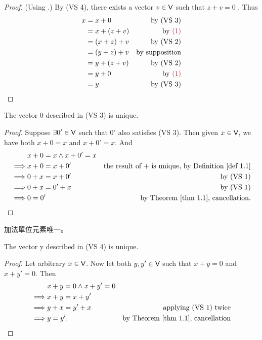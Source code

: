 \begin{proof}
(Using .)
By (VS 4), there exists a vector \(v \in \textsf{V}\) such that \(z + v = 0\) .
Thus
\begin{align*}
    x & = x + 0 & \text{by (VS 3)} \\
      & = x + (z + v) & \text{by \MAROON{(1)}} \\
      & = (x + z) + v & \text{by (VS 2)} \\
      & = (y + z) + v & \text{by supposition} \\
      & = y + (z + v) & \text{by (VS 2)} \\
      & = y + 0 & \text{by \MAROON{(1)}} \\
      & = y & \text{by (VS 3)}
\end{align*}
\end{proof}

\begin{corollary} \label{corollary 1.1.1}
The vector \(0\) described in  (VS 3) is unique.
\end{corollary}

\begin{proof}
Suppose \(\exists 0' \in \textsf{V}\) such that \(0'\) also satisfies  (VS 3).
Then given \(x \in \textsf{V}\), we have both \(x + 0 = x\) and \(x + 0' = x\).
And
\begin{align*}
             & x + 0 = x \land x + 0' = x \\
    \implies & x + 0 = x + 0' & \text{the result of \(+\) is unique, by \DEF{1.1}} \\
    \implies & 0 + x = x + 0' & \text{by (VS 1)} \\
    \implies & 0 + x = 0' + x & \text{by (VS 1)} \\
    \implies & 0 = 0' & \text{by \THM{1.1}, cancellation}.
\end{align*}
\end{proof}

\begin{note}
加法單位元素唯一。
\end{note}

\begin{corollary} \label{corollary 1.1.2}
The vector y described in  (VS 4) is unique.
\end{corollary}

\begin{proof}
Let arbitrary \(x \in \textsf{V}\).
Now let both \(y, y' \in \textsf{V}\) such that \(x + y = 0\) and \(x + y' = 0\).
Then
\begin{align*}
             & x + y = 0 \land x + y' = 0 \\
    \implies & x + y = x + y' \\
    \implies & y + x = y' + x & \text{applying (VS 1) twice} \\
    \implies & y = y'. & \text{by \THM{1.1}, cancellation}
\end{align*}
\end{proof}


